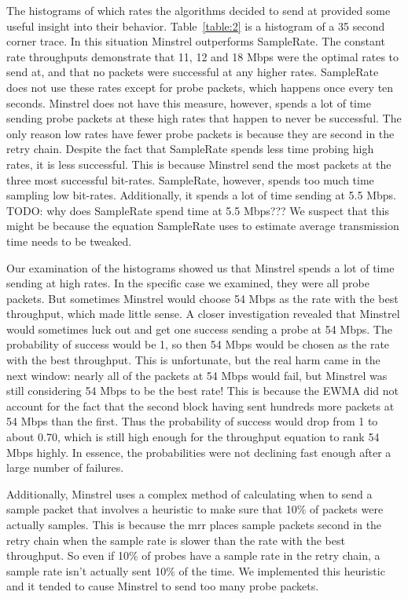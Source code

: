 \documentclass[letterpaper,twocolumn,10pt]{article}
\begin{document}
The histograms of which rates the algorithms decided to send at provided some useful insight into their behavior. Table~\ref{table:2} is a histogram of a 35 second corner trace. In this situation Minstrel outperforms SampleRate. The constant rate throughputs demonstrate that 11, 12 and 18 Mbps were the optimal rates to send at, and that no packets were successful at any higher rates. SampleRate does not use these rates except for probe packets, which happens once every ten seconds. Minstrel does not have this measure, however, spends a lot of time sending probe packets at these high rates that happen to never be successful. The only reason low rates have fewer probe packets is because they are second in the retry chain. Despite the fact that SampleRate spends less time probing high rates, it is less successful. This is because Minstrel send the most packets at the three most successful bit-rates. SampleRate, however, spends too much time sampling low bit-rates. Additionally, it spends a lot of time sending at 5.5 Mbps. TODO: why does SampleRate spend time at 5.5 Mbps??? We suspect that this might be because the equation SampleRate uses to estimate average transmission time needs to be tweaked. 

Our examination of the histograms showed us that Minstrel spends a lot of time sending at high rates. In the specific case we examined, they were all probe packets. But sometimes Minstrel would choose 54 Mbps as the rate with the best throughput, which made little sense. A closer investigation revealed that Minstrel would sometimes luck out and get one success sending a probe at 54 Mbps. The probability of success would be 1, so then 54 Mbps would be chosen as the rate with the best throughput. This is unfortunate, but the real harm came in the next window: nearly all of the packets at 54 Mbps would fail, but Minstrel was still considering 54 Mbps to be the best rate! This is because the EWMA did not account for the fact that the second block having sent hundreds more packets at 54 Mbps than the first. Thus the probability of success would drop from 1 to about 0.70, which is still high enough for the throughput equation to rank 54 Mbps highly. In essence, the probabilities were not declining fast enough after a large number of failures.

Additionally, Minstrel uses a complex method of calculating when to send a sample packet that involves a heuristic to make sure that 10\% of packets were actually samples. This is because the mrr places sample packets second in the retry chain when the sample rate is slower than the rate with the best throughput. So even if 10\% of probes have a sample rate in the retry chain, a sample rate isn't actually sent 10\% of the time. We implemented this heuristic and it tended to cause Minstrel to send too many probe packets.
\end{document}
